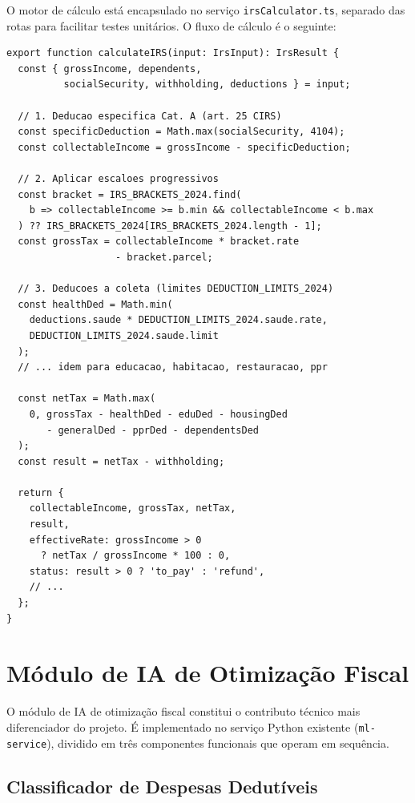 O motor de cálculo está encapsulado no serviço \texttt{irsCalculator.ts}, separado das rotas para facilitar testes unitários. O fluxo de cálculo é o seguinte:

\begin{lstlisting}[caption={Motor de cálculo IRS 2024 --- função principal (irsCalculator.ts).},label={lst:irs-engine}]
export function calculateIRS(input: IrsInput): IrsResult {
  const { grossIncome, dependents,
          socialSecurity, withholding, deductions } = input;

  // 1. Deducao especifica Cat. A (art. 25 CIRS)
  const specificDeduction = Math.max(socialSecurity, 4104);
  const collectableIncome = grossIncome - specificDeduction;

  // 2. Aplicar escaloes progressivos
  const bracket = IRS_BRACKETS_2024.find(
    b => collectableIncome >= b.min && collectableIncome < b.max
  ) ?? IRS_BRACKETS_2024[IRS_BRACKETS_2024.length - 1];
  const grossTax = collectableIncome * bracket.rate
                   - bracket.parcel;

  // 3. Deducoes a coleta (limites DEDUCTION_LIMITS_2024)
  const healthDed = Math.min(
    deductions.saude * DEDUCTION_LIMITS_2024.saude.rate,
    DEDUCTION_LIMITS_2024.saude.limit
  );
  // ... idem para educacao, habitacao, restauracao, ppr

  const netTax = Math.max(
    0, grossTax - healthDed - eduDed - housingDed
       - generalDed - pprDed - dependentsDed
  );
  const result = netTax - withholding;

  return {
    collectableIncome, grossTax, netTax,
    result,
    effectiveRate: grossIncome > 0
      ? netTax / grossIncome * 100 : 0,
    status: result > 0 ? 'to_pay' : 'refund',
    // ...
  };
}
\end{lstlisting}


\section{Módulo de IA de Otimização Fiscal}
\label{sec:impl-fiscal-ia}

O módulo de \ac{IA} de otimização fiscal constitui o contributo técnico mais diferenciador do projeto. É implementado no serviço Python existente (\texttt{ml-service}), dividido em três componentes funcionais que operam em sequência.

\subsection{Classificador de Despesas Dedutíveis}
\label{sec:impl-deduction-classifier}

